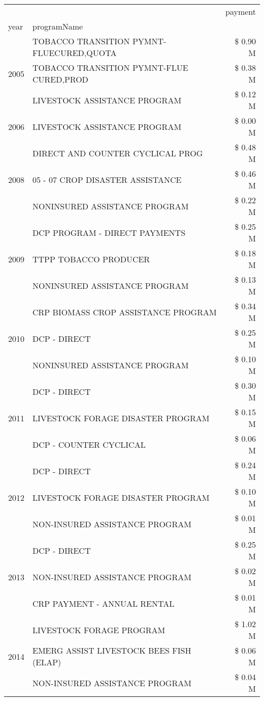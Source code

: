 \begin{tabular}{llr}
\toprule
 &  & payment \\
year & programName &  \\
\midrule
\multirow[t]{3}{*}{2005} & TOBACCO TRANSITION PYMNT-FLUECURED,QUOTA & \$ 0.90 M \\
 & TOBACCO TRANSITION PYMNT-FLUE CURED,PROD & \$ 0.38 M \\
 & LIVESTOCK ASSISTANCE PROGRAM & \$ 0.12 M \\
\cline{1-3}
2006 & LIVESTOCK ASSISTANCE PROGRAM & \$ 0.00 M \\
\cline{1-3}
\multirow[t]{3}{*}{2008} & DIRECT AND COUNTER CYCLICAL PROG & \$ 0.48 M \\
 & 05 - 07 CROP DISASTER ASSISTANCE & \$ 0.46 M \\
 & NONINSURED ASSISTANCE PROGRAM & \$ 0.22 M \\
\cline{1-3}
\multirow[t]{3}{*}{2009} & DCP PROGRAM - DIRECT PAYMENTS & \$ 0.25 M \\
 & TTPP TOBACCO PRODUCER & \$ 0.18 M \\
 & NONINSURED ASSISTANCE PROGRAM & \$ 0.13 M \\
\cline{1-3}
\multirow[t]{3}{*}{2010} & CRP BIOMASS CROP ASSISTANCE PROGRAM & \$ 0.34 M \\
 & DCP - DIRECT & \$ 0.25 M \\
 & NONINSURED ASSISTANCE PROGRAM & \$ 0.10 M \\
\cline{1-3}
\multirow[t]{3}{*}{2011} & DCP - DIRECT & \$ 0.30 M \\
 & LIVESTOCK FORAGE DISASTER PROGRAM & \$ 0.15 M \\
 & DCP - COUNTER CYCLICAL & \$ 0.06 M \\
\cline{1-3}
\multirow[t]{3}{*}{2012} & DCP - DIRECT & \$ 0.24 M \\
 & LIVESTOCK FORAGE DISASTER PROGRAM & \$ 0.10 M \\
 & NON-INSURED ASSISTANCE PROGRAM & \$ 0.01 M \\
\cline{1-3}
\multirow[t]{3}{*}{2013} & DCP - DIRECT & \$ 0.25 M \\
 & NON-INSURED ASSISTANCE PROGRAM & \$ 0.02 M \\
 & CRP PAYMENT - ANNUAL RENTAL & \$ 0.01 M \\
\cline{1-3}
\multirow[t]{3}{*}{2014} & LIVESTOCK FORAGE PROGRAM & \$ 1.02 M \\
 & EMERG ASSIST LIVESTOCK BEES FISH (ELAP) & \$ 0.06 M \\
 & NON-INSURED ASSISTANCE PROGRAM & \$ 0.04 M \\

\end{tabular}
